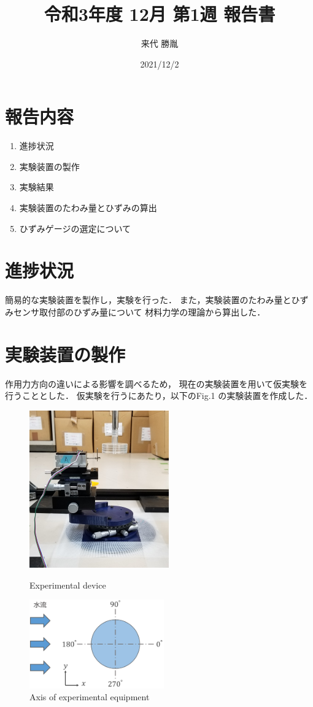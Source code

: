 \documentclass[twocolumn,a4j]{jsarticle}
\author{来代 勝胤}
\title{令和3年度 12月 第1週 報告書}
\date{2021/12/2}
\begin{document}
\columnseprule=0.1mm

\maketitle
\section*{報告内容}
\begin{enumerate}[1.]
    \item 進捗状況
    \item 実験装置の製作
    \item 実験結果
    \item 実験装置のたわみ量とひずみの算出
    \item ひずみゲージの選定について
\end{enumerate}

\section{進捗状況}
簡易的な実験装置を製作し，実験を行った．
また，実験装置のたわみ量とひずみセンサ取付部のひずみ量について
材料力学の理論から算出した．

\section{実験装置の製作}
作用力方向の違いによる影響を調べるため，
現在の実験装置を用いて仮実験を行うこととした．
仮実験を行うにあたり，以下のFig.1 の実験装置を作成した．
\begin{figure}[htbp]
    \footnotesize
    \begin{center}
        \includegraphics[width=60mm]{../../2111/images/device_1.jpg}
        \caption{Experimental device}
        \includegraphics[width=58mm]{../../2111/images/model_1.png}
        \caption{Axis of experimental equipment}
    \end{center}
\end{figure}
\end{document}
